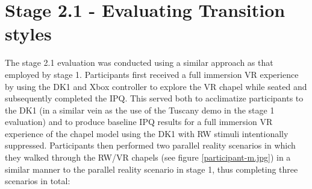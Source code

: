 

\section{Stage 2.1 - Evaluating Transition styles}

The stage 2.1 evaluation was conducted using a similar approach as that employed by stage 1. Participants first received a full immersion VR experience by using the DK1 and Xbox controller to explore the VR chapel while seated and subsequently completed the IPQ. This served both to acclimatize participants to the DK1 (in a similar vein as the use of the Tuscany demo in the stage 1 evaluation) and to produce baseline IPQ results for a full immersion VR experience of the chapel model using the DK1 with RW stimuli intentionally suppressed. Participants then performed two parallel reality scenarios in which they walked through the RW/VR chapels (see figure \ref{participant-m.jpg}) in a similar manner to the parallel reality scenario in stage 1, thus completing three scenarios in total:

